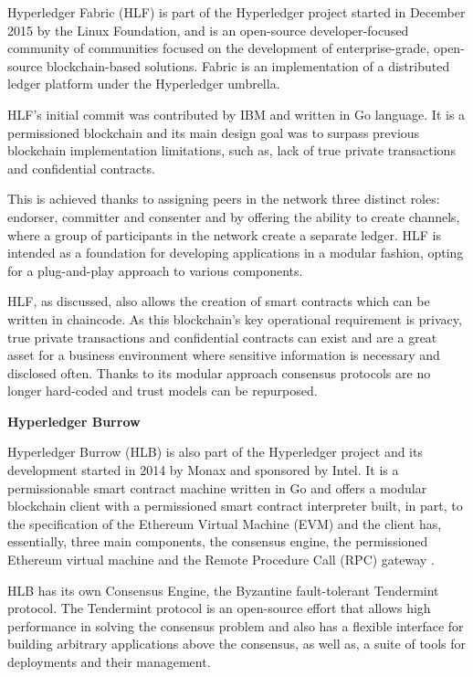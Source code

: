 \documentclass[notitlepage]{llncs}
\begin{document}
Hyperledger Fabric (HLF) is part of the Hyperledger project started in December 2015 by the Linux Foundation, and is an open-source developer-focused community of communities focused on the development of enterprise-grade, open-source blockchain-based solutions. Fabric is an implementation of a distributed ledger platform under the Hyperledger umbrella.
\cite{Cachin2016}
\par
HLF’s initial commit was contributed by IBM and written in Go language. It is a permissioned blockchain and its main design goal was to surpass previous blockchain implementation limitations, such as, lack of true private transactions and confidential contracts.
\par
This is achieved thanks to assigning peers in the network three distinct roles: endorser, committer and consenter and by offering the ability to create channels, where a group of participants in the network create a separate ledger. HLF is intended as a foundation for developing applications in a modular fashion, opting for a plug-and-play approach to various components. \cite{HyperledgerFabricDocs2017}
\par
HLF, as discussed, also allows the creation of smart contracts which can be written in chaincode. As this blockchain's key operational requirement is privacy, true private transactions and confidential contracts can exist and are a great asset for a business environment where sensitive information is necessary and disclosed often. Thanks to its modular approach consensus protocols are no longer hard-coded and trust models can be repurposed.
\par
\vspace{10pt}
\textbf{Hyperledger Burrow}
\vspace{6pt}

Hyperledger Burrow (HLB) is also part of the Hyperledger project and its development started in 2014 by Monax and sponsored by Intel. It is a permissionable smart contract machine written in Go and offers a modular blockchain client with a permissioned smart contract interpreter built, in part, to the specification of the Ethereum Virtual Machine (EVM) and the client has, essentially, three main components, the consensus engine, the permissioned Ethereum virtual machine and the Remote Procedure Call (RPC) gateway .
\cite{Kuhlman2017,HyperledgerBurrow2017}
\par
HLB has its own Consensus Engine, the Byzantine fault-tolerant Tendermint protocol. The Tendermint protocol is an open-source effort that allows high performance in solving the consensus problem and also has a flexible interface for building arbitrary applications above the consensus, as well as, a suite of tools for deployments and their management. \cite{Buchman2016}
\end{document}
